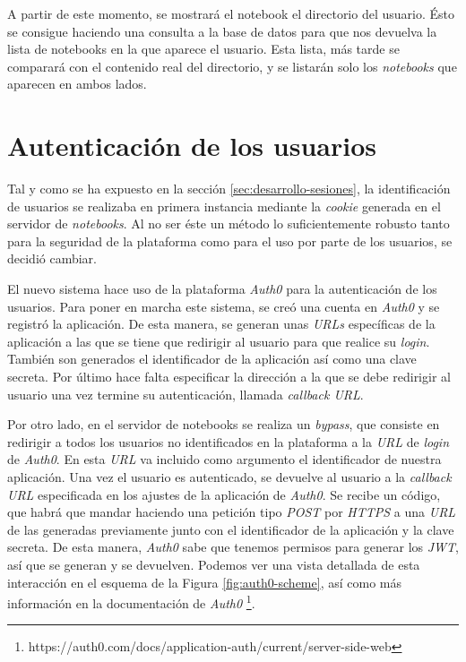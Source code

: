 \documentclass[11pt,spanish,listoffigures,listoftables]{tfgetsinf}
\begin{document}
A partir de este momento, se mostrará el notebook el directorio del usuario. Ésto se consigue haciendo una consulta a la base de datos para que nos devuelva la lista de notebooks en la que aparece el usuario. Esta lista, más tarde se comparará con el contenido real del directorio, y se listarán solo los \textit{notebooks} que aparecen en ambos lados.



\section{Autenticación de los usuarios}
\label{sec:desarrollo-auth}

Tal y como se ha expuesto en la sección \ref{sec:desarrollo-sesiones}, la identificación de usuarios se realizaba en primera instancia mediante la \textit{cookie} generada en el servidor de \textit{notebooks}. Al no ser éste un método lo suficientemente robusto tanto para la seguridad de la plataforma como para el uso por parte de los usuarios, se decidió cambiar.

El nuevo sistema hace uso de la plataforma \textit{Auth0} para la autenticación de los usuarios. Para poner en marcha este sistema, se creó una cuenta en \textit{Auth0} y se registró la aplicación. De esta manera, se generan unas \textit{URLs} específicas de la aplicación a las que se tiene que redirigir al usuario para que realice su \textit{login}. También son generados el identificador de la aplicación así como una clave secreta. Por último hace falta especificar la dirección a la que se debe redirigir al usuario una vez termine su autenticación, llamada \textit{callback URL}. 

Por otro lado, en el servidor de notebooks se realiza un \textit{bypass}, que consiste en redirigir a todos los usuarios no identificados en la plataforma a la \textit{URL} de \textit{login} de \textit{Auth0}. En esta \textit{URL} va incluido como argumento el identificador de nuestra aplicación. Una vez el usuario es autenticado, se devuelve al usuario a la \textit{callback URL} especificada en los ajustes de la aplicación de \textit{Auth0}. Se recibe un código, que habrá que mandar haciendo una petición tipo \textit{POST} por \textit{HTTPS} a una \textit{URL} de las generadas previamente junto con el identificador de la aplicación y la clave secreta. De esta manera, \textit{Auth0} sabe que tenemos permisos para generar los \textit{JWT}, así que se generan y se devuelven.
Podemos ver una vista detallada de esta interacción en el esquema de la Figura \ref{fig:auth0-scheme}, así como más información en la documentación de \textit{Auth0} \footnote{https://auth0.com/docs/application-auth/current/server-side-web}.
\end{document}
